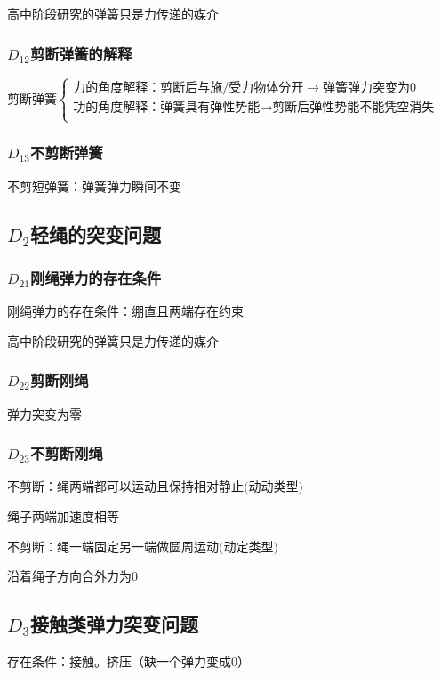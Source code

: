 \documentclass[lang=cn,10pt]{elegantbook}
\begin{document}
       高中阶段研究的弹簧只是力传递的媒介
       \subsubsection{$D_{12}$剪断弹簧的解释}
       $\text{剪断弹簧}\begin{cases}
       	\text{力的角度解释：剪断后与施}/\text{受力物体分开}\rightarrow \text{弹簧弹力突变为}0\\
       	\text{功的角度解释：弹簧具有弹性势能}\rightarrow \text{剪断后弹性势能不能凭空消失}\\
       \end{cases}$
       \subsubsection{$D_{13}$不剪断弹簧}
       不剪短弹簧：弹簧弹力瞬间不变
       
       \subsection{$D_{2}$轻绳的突变问题}
       \subsubsection{$D_{21}$刚绳弹力的存在条件}
       刚绳弹力的存在条件：绷直且两端存在约束
       
       高中阶段研究的弹簧只是力传递的媒介
       \subsubsection{$D_{22}$剪断刚绳}
    弹力突变为零
       \subsubsection{$D_{23}$不剪断刚绳}
       不剪断：$\text{绳两端都可以运动且保持相对静止(动动类型)}$
       
       绳子两端加速度相等
       
         不剪断：$\text{绳一端固定另一端做圆周运动(动定类型)}$
         
         沿着绳子方向合外力为0
         \subsection{$D_{3}$接触类弹力突变问题}
         存在条件：接触。挤压（缺一个弹力变成0）
         
\end{document}
